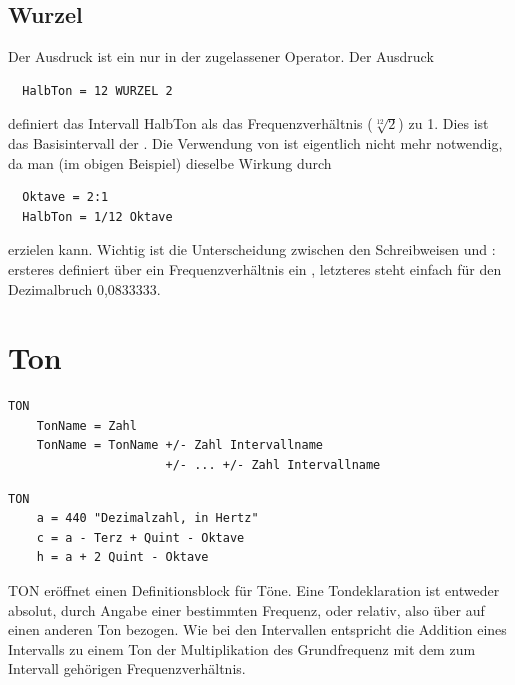\subsection{ Wurzel}
\label{sec:SX_ROOT}



Der Ausdruck  ist ein nur in der
 zugelassener
Operator. Der Ausdruck

\begin{verbatim}
  HalbTon = 12 WURZEL 2 
\end{verbatim}


definiert das Intervall HalbTon als das Frequenzverhältnis 
($\sqrt[12]{2}$) zu 1. Dies ist das Basisintervall der . Die Verwendung von  ist eigentlich nicht 
mehr notwendig, da man (im obigen Beispiel) dieselbe Wirkung 
durch

\begin{verbatim}
  Oktave = 2:1 
  HalbTon = 1/12 Oktave 
\end{verbatim}


erzielen kann. Wichtig ist die Unterscheidung zwischen den Schreibweisen 
 und : ersteres definiert über ein Frequenzverhältnis 
ein , letzteres steht einfach für 
den Dezimalbruch 0,0833333.

\section{Ton}
\label{sec:SX_TONE}


\begin{verbatim}
TON
    TonName = Zahl
    TonName = TonName +/- Zahl Intervallname 
                      +/- ... +/- Zahl Intervallname
\end{verbatim}




\begin{verbatim}
TON
    a = 440 "Dezimalzahl, in Hertz"
    c = a - Terz + Quint - Oktave 
    h = a + 2 Quint - Oktave
\end{verbatim}




TON eröffnet einen Definitionsblock für Töne. Eine Tondeklaration 
ist entweder absolut, durch Angabe einer bestimmten Frequenz, 
oder relativ, also über  auf einen 
anderen Ton bezogen. Wie bei den Intervallen entspricht die Addition 
eines Intervalls zu einem Ton der Multiplikation des Grundfrequenz 
mit dem zum Intervall gehörigen Frequenzverhältnis.


